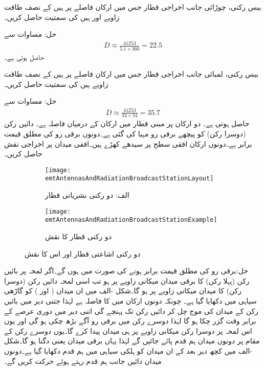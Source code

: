 بیس رکنی، چوڑائی جانب اخراجی قطار جس میں ارکان  فاصلے پر ہیں کے نصف طاقت زاویے  اور  ہیں کی سمتیت حاصل کریں۔

حل: مساوات  سے 
\begin{align*}
D \approx \frac{\num{41253}}{5.1 \times 360}=22.5
\end{align*}
حاصل ہوتی ہے۔


بیس رکنی، لمبائی جانب اخراجی قطار جس میں ارکان  فاصلے پر ہیں کے نصف طاقت زاویے  ہیں کی سمتیت حاصل کریں۔

حل: مساوات  سے 
\begin{align*}
D \approx \frac{\num{41253}}{34 \times 34}=35.7
\end{align*}
حاصل ہوتی ہے۔
دو ارکان پر مبنی قطار میں ارکان کے درمیان فاصلہ  ہے۔ دائیں رکن (دوسرا رکن) کو  پیچھے برقی رو مہیا کی گئی ہے۔دونوں برقی رو کی مطلق قیمت برابر ہے۔دونوں ارکان افقی سطح پر سیدھے کھڑے ہیں۔افقی میدان پر اخراجی نقش حاصل کریں۔
   
\begin{figure}
\centering
\begin{subfigure}{0.5\textwidth}
\centering
\texttt{[image: emtAntennasAndRadiationBroadcastStationLayout]}
\caption*{الف: دو رکنی نشریاتی قطار}
\end{subfigure}%
%
\begin{subfigure}{0.5\textwidth}
\centering
\texttt{[image: emtAntennasAndRadiationBroadcastStationExample]}
\caption*{دو رکنی قطار کا نقش}
\end{subfigure}%
\caption{دو رکنی اشاعتی قطار اور اس کا نقش}
\label{شکل_اینٹینا_اشاعتی_قطار}
\end{figure}

حل:برقی رو کی مطلق قیمت برابر ہونے کی صورت میں  ہوں گے۔اگر لمحہ  پر بائیں رکن (پہلا رکن) کا برقی میدان  میکانی زاویے پر ہو تب اسی لمحہ دائیں رکن (دوسرا رکن) کا میدان  میکانی زاویے پر ہو گا۔شکل -الف میں ان میدان ( اور ) کو گاڑھی سیاہی میں دکھایا گیا ہے۔ چونکہ دونوں ارکان میں  کا فاصلہ ہے لہٰذا جتنی دیر میں بائیں رکن کے میدان کی موج  چل کر دائیں رکن تک پہنچے گی اتنی دیر میں دوری عرصے کے  برابر وقت گزر چکا ہو گا لہٰذا دوسرے رکن میں برقی رو  آگے بڑھ چکی ہو گی اور یوں اس لمحہ پر دوسرا رکن  میکانی زاویے پر ہی میدان پیدا کرے گا۔یوں دوسرے رکن کے مقام پر دونوں میدان ہم قدم پائے جائیں گے لہٰذا یہاں برقی میدان  یعنی دگنا ہو گا۔شکل -الف میں کچھ دیر بعد کے ان میدان کو ہلکی سیاہی میں ہم قدم دکھایا گیا ہے۔دونوں میدان دائیں جانب ہم قدم رہتے ہوئے حرکت کریں گے۔

